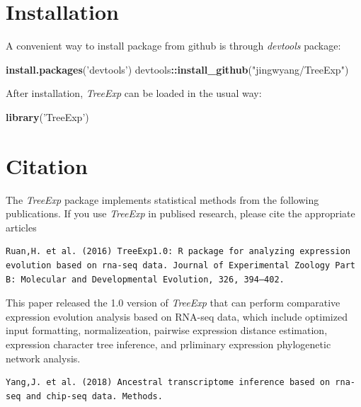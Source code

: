 \documentclass[]{book}
\newenvironment{Shaded}{\begin{snugshade}}{\end{snugshade}}
\newcommand{\KeywordTok}[1]{\textcolor[rgb]{0.13,0.29,0.53}{\textbf{#1}}}
\newcommand{\NormalTok}[1]{#1}
\newcommand{\OperatorTok}[1]{\textcolor[rgb]{0.81,0.36,0.00}{\textbf{#1}}}
\newcommand{\StringTok}[1]{\textcolor[rgb]{0.31,0.60,0.02}{#1}}
\begin{document}
\hypertarget{installation}{%
\section{Installation}\label{installation}}

A convenient way to install package from github is through \emph{devtools} package:

\begin{Shaded}
\begin{Highlighting}[]
\KeywordTok{install.packages}\NormalTok{(}\StringTok{'devtools'}\NormalTok{)}
\NormalTok{devtools}\OperatorTok{::}\KeywordTok{install_github}\NormalTok{(}\StringTok{"jingwyang/TreeExp"}\NormalTok{)}
\end{Highlighting}
\end{Shaded}

After installation, \emph{TreeExp} can be loaded in the usual way:

\begin{Shaded}
\begin{Highlighting}[]
\KeywordTok{library}\NormalTok{(}\StringTok{'TreeExp'}\NormalTok{)}
\end{Highlighting}
\end{Shaded}

\newpage

\hypertarget{citation}{%
\section{Citation}\label{citation}}

The \emph{TreeExp} package implements statistical methods from the following publications. If you use \emph{TreeExp} in publised research, please cite the appropriate articles

\begin{verbatim}
Ruan,H. et al. (2016) TreeExp1.0: R package for analyzing expression evolution based on rna-seq data. Journal of Experimental Zoology Part B: Molecular and Developmental Evolution, 326, 394–402.
\end{verbatim}

This paper \citep{doi:10.1002/jez.b.22707} released the 1.0 version of \emph{TreeExp} that can perform comparative expression evolution analysis based on RNA-seq data, which include optimized input formatting, normalizeation, pairwise expression distance estimation, expression character tree inference, and prliminary expression phylogenetic network analysis.

\begin{verbatim}
Yang,J. et al. (2018) Ancestral transcriptome inference based on rna-seq and chip-seq data. Methods.
\end{verbatim}
\end{document}

